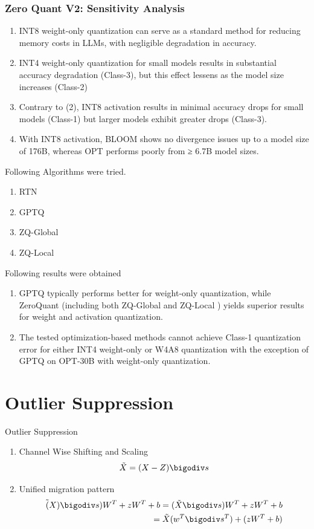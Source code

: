 \documentclass{beamer}
\theoremstyle{plain}
\theoremstyle{definition}
\theoremstyle{remark}
\numberwithin{equation}{section}
\numberwithin{figure}{section}
\numberwithin{theorem}{section}
\begin{document}
\begin{frame}
\frametitle {Zero Quant V2: Sensitivity Analysis}
\begin{enumerate}
\item INT8 weight-only quantization can serve as a standard
method for reducing memory costs in LLMs, with negligible degradation in accuracy.
\item INT4
weight-only quantization for small models results in substantial accuracy degradation (Class-3), but
this effect lessens as the model size increases (Class-2)
\item Contrary to (2), INT8 activation results in
minimal accuracy drops for small models (Class-1) but larger models exhibit greater drops (Class-3).
\item  With INT8 activation, BLOOM shows no divergence issues up to a model size of 176B, whereas
OPT performs poorly from ≥ 6.7B model sizes.
\end{enumerate}
\end{frame}

\begin{frame}[shrink]
Following Algorithms were tried.
\begin{enumerate}
    \item RTN
    \item GPTQ
    \item ZQ-Global
    \item ZQ-Local
\end{enumerate}
Following results were obtained
\begin{enumerate}
    \item GPTQ typically performs better for weight-only quantization, while
ZeroQuant (including both ZQ-Global and ZQ-Local
) yields superior results for weight and activation
quantization. 
    \item The tested optimization-based methods cannot achieve Class-1 quantization error
for either INT4 weight-only or W4A8 quantization with the exception of GPTQ on OPT-30B with
weight-only quantization.
\end{enumerate}
\end{frame}
\section{Outlier Suppression}

\begin{frame}{Outlier Suppression}
\begin{enumerate}
    \item Channel Wise Shifting and  Scaling
    \begin{align}
        \Tilde{X} = (X - Z) \bigodiv s
    \end{align}
    \item Unified migration pattern
    \begin{align}
    \Tilde(X) \bigodiv s) W^T + zW^T + b = (\Tilde{X} \bigodiv s ) W^T + zW^T + b \\
    = \Tilde{X} (w^T \bigodiv s^T) + (zW^T + b)
    \end{align}
\end{enumerate}
\end{frame}
\end{document}
